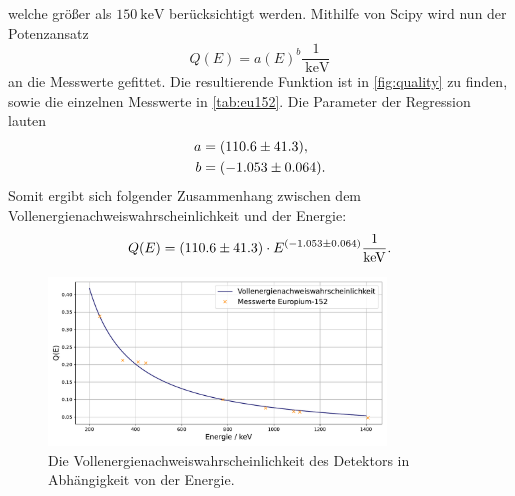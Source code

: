  welche größer als $\qty{150}{\kilo\electronvolt}$ berücksichtigt werden. Mithilfe von Scipy\cite{scipy} wird nun der Potenzansatz
\begin{equation}
    Q(E) = a(E)^b \frac{1}{\qty{}{\kilo\electronvolt}}
\end{equation}
an die Messwerte gefittet. Die resultierende Funktion ist in \autoref{fig:quality} zu finden, sowie die einzelnen Messwerte in \autoref{tab:eu152}. Die Parameter der Regression lauten
\begin{align}
    \label{Q_params}
    a &= \qty{110.6 \pm 41.3}{},\\
    b &= \qty{-1.053 \pm 0.064}{}.
\end{align}
Somit ergibt sich folgender Zusammenhang zwischen dem Vollenergienachweiswahrscheinlichkeit und der Energie:
\begin{equation}
    Q(E) = \qty{110.6 \pm 41.3}{}\cdot E^{\qty{-1.053 \pm 0.064}{}} \qty{}{\per\kilo\electronvolt}.
\end{equation}
\begin{figure}
    \centering
    \includegraphics[width = 0.8\textwidth]{plots/quality.pdf}
    \caption{Die Vollenergienachweiswahrscheinlichkeit des Detektors in Abhängigkeit von der Energie.}
    \label{fig:quality}
\end{figure}

